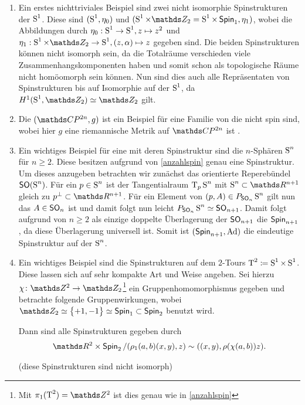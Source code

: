 \begin{Bsp}
\begin{enumerate}[(1)]
  \item \label{Bsp:spinstrukturAufsphere} Ein erstes nichttriviales Beispiel sind zwei nicht isomorphie
    Spinstrukturen der $\S^1$. Diese sind $(\S^1 , \eta_0)$ und
    $(\S^1 \times \Z_2 = \S^1 \times \spin_1 , \eta_1)$, wobei die
    Abbildungen durch $\eta_0 : \S^1 \rightarrow \S^1 , z \mapsto z^2$
    und
    $\eta_1 : \S^1 \times \Z_2 \rightarrow \S^1 , (z,\alpha) \mapsto
    z$
    gegeben sind. Die beiden Spinstrukturen können nicht isomorph
    sein, da die Totalräume verschieden viele Zusammenhangskomponenten
    haben und somit schon als topologische Räume nicht homöomorph sein
    können. Nun sind dies auch alle Repräsentaten von
    Spinstrukturen bis auf Isomorphie auf der $ \S^1 $, da $ H^1(\S^1,\Z_2) \simeq \Z_2 $ gilt.
  \item Die $(\CP^{2n},g)$ ist ein Beispiel für eine Familie von
    \RMFen die nicht spin sind, wobei hier $g$ eine riemannische
    Metrik auf $\CP^{2n}$ ist \cite[Seite 96]{BHMMM15}.
    
  \item \label{SpinstrSphäre}Ein wichtiges Beispiel für eine \RMF mit deren Spinstruktur
    sind die $ n $-Sphären $\S^n$ für $ n \geq 2 $. Diese besitzen  
    aufgrund von \cref{anzahlspin} genau eine Spinstruktur. Um 
    dieses anzugeben betrachten wir zunächst das orientierte Reperebündel $ \so(\S^n) $. Für ein $ p\in\S^n $ ist der Tangentialraum $ \tang{p}{\S^n} $ mit $ \S^n\subset\R^{n+1} $ 
    gleich zu $ p^\bot\subset\R^{n+1} $. Für ein Element von $ (p,A)\in \Ph{\so_n}{\S^n} $ gilt nun das $ A \in\so_n$ ist und damit folgt
    nun leicht $ \Ph{\so_n}{\S^n} \simeq \so_{n+1} $. Damit folgt
    aufgrund von $ n\geq 2 $ als einzige doppelte Überlagerung der
    $ \so_{n+1} $ die $ \spin_{n+1} $, da diese Überlagerung universell ist. Somit ist $ (\spin_{n+1},\Ad) $ die eindeutige
    Spinstruktur auf der $ \S^n $.
  \item Ein wichtiges Beispiel sind die Spinstrukturen auf dem $ 2 $-Tours $ \TT^2 \coloneqq \S^1\times\S^1$. Diese lassen sich auf sehr
  kompakte Art und Weise angeben.
  Sei hierzu $ \abb{\chi}{\Z^2}{\Z_2}$\footnote{Mit $ \pi_1(\TT^2)=\Z^2 $ ist dies genau wie in \cref{anzahlspin}} ein Gruppenhomomorphismus gegeben
  und betrachte folgende Gruppenwirkungen, wobei $ \Z_2\simeq\sset{+1,-1}\simeq\spin_1 \subset\spin_2 $ benutzt wird.


  Dann sind alle Spinstrukturen gegeben durch  
  \begin{gather*}
  	\R^2 \times \spin_2 / (\rho_1(a,b)(x,y),z) \sim ((x,y),\rho(\chi(a,b))z).
  \end{gather*}
  \begin{smallproof}(diese Spinstrukturen sind nicht isomorph)
  \end{smallproof}
  
	\end{enumerate}
\end{Bsp}

